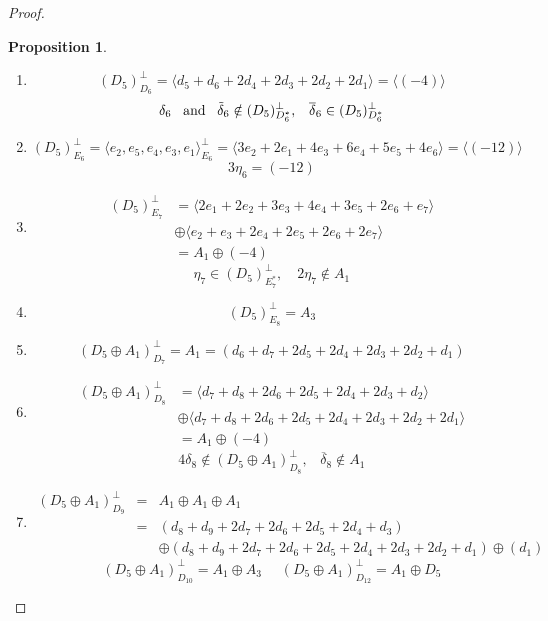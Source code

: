 \documentclass{amsart}
\newtheorem{proposition}{Proposition}
\begin{document}
\begin{proof}
\begin{proposition}
\begin{enumerate}
$$\begin{matrix}
                                                 0 & -2 & 1 \\
                                                 1 & 1 & -2
                                                  \end{matrix} 
                                                 \right ) \simeq A_3$$
\item
$$(D_5)_{D_6}^{\perp}=\langle d_5+d_6+2d_4+2d_3+2d_2+2d_1 \rangle=\langle (-4)\rangle$$
$${\delta}_6 \,\,\,\,\,\hbox{and}\,\,\,\,\, \tilde{\delta}_6 \notin (D_5)_{D_6^*}^{\perp},\,\,\,\,\,\overline{\delta}_6 \in (D_5)_{D_6^*}^{\perp}$$
\item
$$(D_5)_{E_6}^{\perp}=\langle e_2,e_5,e_4,e_3,e_1 \rangle _{E_6}^{\perp}=\langle 3e_2+2e_1+4e_3+6e_4+5e_5+4e_6 \rangle =\langle (-12) \rangle$$ 
$$3\eta_6 =(-12)$$
\item
$$
\begin{array}{ll}
(D_5)_{E_7}^{\perp} &= \langle 2e_1+2e_2+3e_3+4e_4+3e_5+2e_6+e_7 \rangle \\
                   & \oplus \langle e_2+e_3+2e_4+2e_5+2e_6+2e_7 \rangle \\
                   &=A_1\oplus (-4)
\end{array}
$$
$$\eta_7\in (D_5)_{E_7^*}^{\perp},\,\,\,\,\,\,2\eta_7 \notin A_1$$
\item
$$(D_5)_{E_8}^{\perp}=A_3$$
\item 
$$(D_5 \oplus A_1 )_{D_7}^{\perp}=A_1=(d_6+d_7+2d_5+2d_4+2d_3+2d_2+d_1)$$
\item
$$
\begin{array}{ll}
(D_5\oplus A_1)_{D_8}^{\perp} & =\langle d_7+d_8+2d_6+2d_5+2d_4+2d_3+d_2\rangle \\
      & \oplus \langle d_7+d_8+2d_6+2d_5+2d_4+2d_3+2d_2+2d_1 \rangle \\
     & = A_1 \oplus (-4)
\end{array}
$$
$$4\delta_8 \notin (D_5 \oplus A_1)_{D_8}^{\perp},\,\,\,\,\,\overline{\delta}_8\notin A_1 $$
\item
$$
\begin{array}{lll}
(D_5 \oplus A_1 )_{D_9}^{\perp} & = & A_1\oplus A_1 \oplus A_1 \\
                                 &  = & (d_8+d_9+2d_7+2d_6+2d_5+2d_4+d_3)\\
  &  & \oplus (d_8+d_9+2d_7+2d_6+2d_5+2d_4+2d_3+2d_2+d_1)  \oplus (d_1)
\end{array}
$$
$$(D_5 \oplus A_1 )_{D_{10}}^{\perp}=A_1\oplus A_3 \,\,\,\,\,\,\,\,(D_5 \oplus A_1 )_{D_{12}}^{\perp}=A_1\oplus D_5$$

\end{enumerate}
\end{proposition}
\end{proof}
\end{document}
